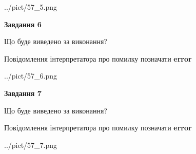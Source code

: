 \documentclass[10pt, ukrainian]{article}
\begin{document}
{\begin {large}
\begin{center}
	{../pict/57_5.png}
\end{center}
\newpage

{\begin {center}\textbf{Завдання 6}\end {center}}\par
Що буде виведено за виконання? \par
Повідомлення інтерпретатора про помилку позначати \textbf{error}

\begin{center}
	{../pict/57_6.png}
\end{center}
\newpage

{\begin {center}\textbf{Завдання 7}\end {center}}\par
Що буде виведено за виконання? \par
Повідомлення інтерпретатора про помилку позначати \textbf{error}

\begin{center}
	{../pict/57_7.png}
\end{center}
\newpage

\end {large}}
\end{document}
